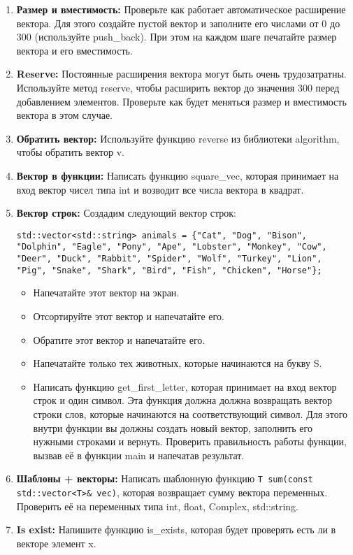 \documentclass{article}
\begin{document}
\begin{enumerate}
\item \textbf{Размер и вместимость:} Проверьте как работает автоматическое расширение вектора. Для этого создайте пустой вектор и заполните его числами от 0 до 300 (используйте push\_back). При этом на каждом шаге печатайте размер вектора и его вместимость.
\item \textbf{Reserve:} Постоянные расширения вектора могут быть очень трудозатратны. Используйте метод reserve, чтобы расширить вектор до значения 300 перед добавлением элементов. Проверьте как будет меняться размер и вместимость вектора в этом случае.
\item \textbf{Обратить вектор:} Используйте функцию reverse из библиотеки algorithm, чтобы обратить вектор v.
\item \textbf{Вектор в функции:} Написать функцию square\_vec, которая принимает на вход вектор чисел типа int и возводит все числа вектора в квадрат.

\item \textbf{Вектор строк:} Создадим следующий вектор строк:
\begin{lstlisting}
std::vector<std::string> animals = {"Cat", "Dog", "Bison", "Dolphin", "Eagle", "Pony", "Ape", "Lobster", "Monkey", "Cow", "Deer", "Duck", "Rabbit", "Spider", "Wolf", "Turkey", "Lion", "Pig", "Snake", "Shark", "Bird", "Fish", "Chicken", "Horse"};
\end{lstlisting}
\begin{itemize}
\item Напечатайте этот вектор на экран.
\item Отсортируйте этот вектор и напечатайте его.
\item Обратите этот вектор и напечатайте его.
\item Напечатайте только тех животных, которые начинаются на букву S.
\item Написать функцию get\_first\_letter, которая принимает на вход вектор строк и один символ. Эта функция должна должна возвращать вектор строки слов, которые начинаются на соответствующий символ. Для этого внутри функции вы должны создать новый вектор, заполнить его нужными строками и вернуть. Проверить правильность работы функции, вызвав её в функции main и напечатав результат.
\end{itemize}
\item \textbf{Шаблоны + векторы:} Написать шаблонную функцию \texttt{T sum(const std::vector<T>\& vec)}, которая возвращает сумму вектора переменных. Проверить её на переменных типа int, float, Complex, std::string.
\item \textbf{Is exist:} Напишите функцию is\_exists, которая будет проверять есть ли в векторе элемент x.
\end{enumerate}
\end{document}
